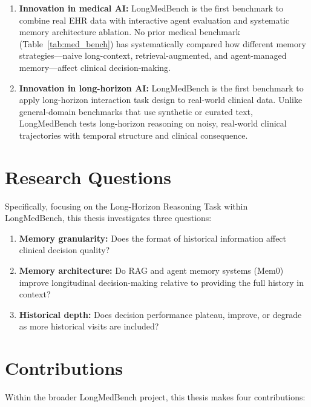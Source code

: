 \begin{enumerate}
    \item \textbf{Innovation in medical AI:} LongMedBench is the first benchmark to combine real EHR data with interactive agent evaluation and systematic memory architecture ablation. No prior medical benchmark (Table~\ref{tab:med_bench}) has systematically compared how different memory strategies---naive long-context, retrieval-augmented, and agent-managed memory---affect clinical decision-making.
    
    \item \textbf{Innovation in long-horizon AI:} LongMedBench is the first benchmark to apply long-horizon interaction task design to real-world clinical data. Unlike general-domain benchmarks that use synthetic or curated text, LongMedBench tests long-horizon reasoning on noisy, real-world clinical trajectories with temporal structure and clinical consequence.
\end{enumerate}

\section{Research Questions}

Specifically, focusing on the Long-Horizon Reasoning Task within LongMedBench, this thesis investigates three questions:

\begin{enumerate}
    \item \textbf{Memory granularity:} Does the format of historical information affect clinical decision quality?
    \item \textbf{Memory architecture:} Do RAG and agent memory systems (Mem0) improve longitudinal decision-making relative to providing the full history in context?
    \item \textbf{Historical depth:} Does decision performance plateau, improve, or degrade as more historical visits are included?
\end{enumerate}

\section{Contributions}

Within the broader LongMedBench project, this thesis makes four contributions:

